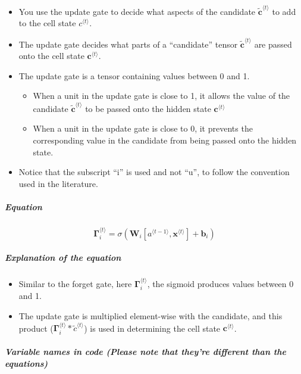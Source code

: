 \documentclass[11pt]{article}
\providecommand{\tightlist}{%
      \setlength{\itemsep}{0pt}\setlength{\parskip}{0pt}}
\begin{document}
\begin{itemize}
\tightlist
\item
  You use the update gate to decide what aspects of the candidate
  \(\tilde{\mathbf{c}}^{\langle t \rangle}\) to add to the cell state
  \(c^{\langle t \rangle}\).
\item
  The update gate decides what parts of a ``candidate'' tensor
  \(\tilde{\mathbf{c}}^{\langle t \rangle}\) are passed onto the cell
  state \(\mathbf{c}^{\langle t \rangle}\).
\item
  The update gate is a tensor containing values between 0 and 1.

  \begin{itemize}
  \tightlist
  \item
    When a unit in the update gate is close to 1, it allows the value of
    the candidate \(\tilde{\mathbf{c}}^{\langle t \rangle}\) to be
    passed onto the hidden state \(\mathbf{c}^{\langle t \rangle}\)
  \item
    When a unit in the update gate is close to 0, it prevents the
    corresponding value in the candidate from being passed onto the
    hidden state.
  \end{itemize}
\item
  Notice that the subscript ``i'' is used and not ``u'', to follow the
  convention used in the literature.
\end{itemize}

\hypertarget{equation}{%
\subparagraph{Equation}\label{equation}}

\[\mathbf{\Gamma}_i^{\langle t \rangle} = \sigma(\mathbf{W}_i[a^{\langle t-1 \rangle}, \mathbf{x}^{\langle t \rangle}] + \mathbf{b}_i)\tag{2} \]

\hypertarget{explanation-of-the-equation}{%
\subparagraph{Explanation of the
equation}\label{explanation-of-the-equation}}

\begin{itemize}
\tightlist
\item
  Similar to the forget gate, here
  \(\mathbf{\Gamma}_i^{\langle t \rangle}\), the sigmoid produces values
  between 0 and 1.
\item
  The update gate is multiplied element-wise with the candidate, and
  this product
  (\(\mathbf{\Gamma}_{i}^{\langle t \rangle} * \tilde{c}^{\langle t \rangle}\))
  is used in determining the cell state
  \(\mathbf{c}^{\langle t \rangle}\).
\end{itemize}

\hypertarget{variable-names-in-code-please-note-that-theyre-different-than-the-equations}{%
\subparagraph{Variable names in code (Please note that they're different
than the
equations)}\label{variable-names-in-code-please-note-that-theyre-different-than-the-equations}}
\end{document}
